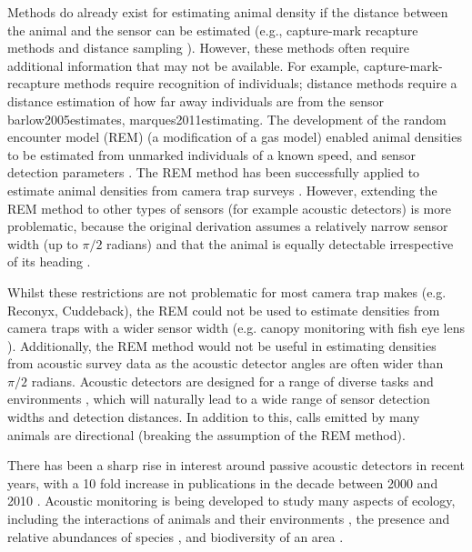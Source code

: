 \documentclass[a4paper,10pt,reqno,oneside]{amsart}
\begin{document}
Methods do already exist for estimating animal density if the distance between the animal and the sensor can be estimated (e.g., capture-mark recapture methods \citep{karanth1995estimating} and distance sampling \citep{harris2013applying}). However, these methods often require additional information that may not be available. For example, capture-mark-recapture methods \citep{karanth1995estimating, trolle2003estimation, soisalo2006estimating, trolle2007camera} require recognition of individuals; distance methods require a distance estimation of how far away individuals are from the sensor {barlow2005estimates, marques2011estimating}. The development of the random encounter model (REM) (a modification of a gas model) enabled animal densities to be estimated from unmarked individuals of a known speed, and sensor detection parameters \citep{rowcliffe2008estimating}. The REM method has been successfully applied to estimate animal densities from camera trap surveys \citep{manzo2012estimation, zero2013monitoring}. However, extending the REM method to other types of sensors (for example acoustic detectors) is more problematic, because the original derivation assumes a relatively narrow sensor width (up to $\pi/2$ radians) and that the animal is equally detectable irrespective of its heading \citep{rowcliffe2008estimating}. 

Whilst these restrictions are not problematic for most camera trap makes (e.g. Reconyx, Cuddeback), the REM could not be used to estimate densities from camera traps with a wider sensor width (e.g. canopy monitoring with fish eye lens \citep{brusa2014increasing}). Additionally, the REM method would not be useful in estimating densities from acoustic survey data as the acoustic detector angles are often wider than $\pi/2$ radians.  Acoustic detectors are designed for a range of diverse tasks and environments \citep{kessel2014review}, which will naturally lead to a wide range of sensor detection widths and detection distances. In addition to this, calls emitted by many animals are directional (breaking the assumption of the REM method). 


There has been a sharp rise in interest around passive acoustic detectors in recent years, with a 10 fold increase in publications in the decade between 2000 and 2010 \citep{kessel2014review}. Acoustic monitoring is being developed to study many aspects of ecology, including the interactions of animals and their environments \citep{blumstein2011acoustic, rogers2013density}, the presence and relative abundances of species \citep{marcoux2011local}, and biodiversity of an area \citep{depraetere2012monitoring}. 
\end{document}
